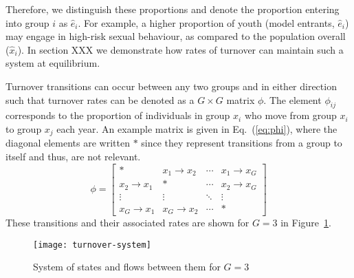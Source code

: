 Therefore, we distinguish these proportions %
and denote the proportion entering into group $i$ as $\hat{e}_i$.
For example, a higher proportion of youth (model entrants, $\hat{e}_i$)    %
may engage in high-risk sexual behaviour,
as compared to the population overall ($\hat{x}_i$).
In section XXX we demonstrate 
how rates of turnover can maintain such a system at equilibrium.  %

\par
Turnover transitions can occur between any two groups and in either direction such %
that turnover rates can be denoted as a $G \times G$ matrix $\phi$.
The element $\phi_{ij}$ corresponds to the proportion of individuals in group $x_i$
who move from group $x_i$ to group $x_j$ each year.
An example matrix is given in Eq.~(\ref{eq:phi}),
where the diagonal elements are written $*$ since they represent
transitions from a group to itself and thus, are not relevant. %
\begin{equation}\label{eq:phi}
\phi = \left[\begin{array}{cccc}
	         *          & x_1  \rightarrow x_2 & \cdots & x_1 \rightarrow x_G \\[0.5em]
	x_2 \rightarrow x_1 &          *           & \cdots & x_2 \rightarrow x_G \\[0.5em]
	      \vdots        &        \vdots        & \ddots &       \vdots        \\[0.5em]
	x_G \rightarrow x_1 & x_G \rightarrow x_2  & \cdots &          *
\end{array}\right]
\end{equation}
These transitions and their associated rates		%
are shown for $G = 3$ in Figure~\ref{fig:system}.
\begin{figure}
  \centering
  \texttt{[image: turnover-system]}
  \caption{System of states and flows between them for $G = 3$}
  \label{fig:system}
\end{figure}

